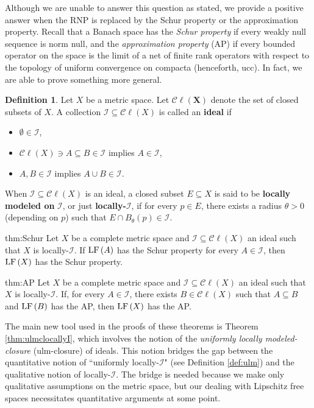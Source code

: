 \documentclass[12pt]{amsart}
\theoremstyle{definition}
\newtheorem{definition}[theorem]{Definition}
\numberwithin{equation}{section}
\def \I {\mathcal{I}}
\def \sbs {\subseteq}
\newcommand{\Cl}[1]{\mathcal{C}\ell\left(#1\right)}
\begin{document}
Although we are unable to answer this question as stated, we provide a positive answer when the RNP is replaced by the Schur property or the approximation property. Recall that a Banach space has the \emph{Schur property} if every weakly null sequence is norm null, and the \emph{approximation property} (AP) if every bounded operator on the space is the limit of a net of finite rank operators with respect to the topology of uniform convergence on compacta (henceforth, ucc). In fact, we are able to prove something more general.

\begin{definition}
Let $X$ be a metric space. Let $\boldsymbol{\Cl{X}}$ denote the set of closed subsets of $X$. A collection $\I \sbs \Cl{X}$ is called an \textbf{ideal} if
\begin{itemize}
\item $\emptyset \in \I$,
\item $\Cl{X} \ni A \sbs B \in \I$ implies $A \in \I$,
\item $A,B \in \I$ implies $A \cup B \in \I$.
\end{itemize}
When $\I \sbs \Cl{X}$ is an ideal, a closed subset $E \sbs X$ is said to be \textbf{locally modeled on} $\boldsymbol{\I}$, or just \textbf{locally-}$\boldsymbol{\I}$, if for every $p \in E$, there exists a radius $\theta > 0$ (depending on $p$) such that $E \cap B_\theta(p) \in \I$.
\end{definition}

\begin{reptheorem}{thm:Schur}
Let $X$ be a complete metric space and $\I \sbs \Cl{X}$ an ideal such that $X$ is locally-$\I$. If $\LF{A}$ has the Schur property for every $A \in \I$, then $\LF{X}$ has the Schur property.
\end{reptheorem}

\begin{reptheorem}{thm:AP}
Let $X$ be a complete metric space and $\I \sbs \Cl{X}$ an ideal such that $X$ is locally-$\I$. If, for every $A \in \I$, there exists $B \in \Cl{X}$ such that $A \sbs B$ and $\LF{B}$ has the AP, then $\LF{X}$ has the AP.
\end{reptheorem}

The main new tool used in the proofs of these theorems is Theorem \ref{thm:ulmclocallyI}, which involves the notion of the \emph{uniformly locally modeled-closure} (ulm-closure) of ideals. This notion bridges the gap between the quantitative notion of ``uniformly locally-$\I$" (see Definition \ref{def:ulm}) and the qualitative notion of locally-$\I$. The bridge is needed because we make only qualitative assumptions on the metric space, but our dealing with Lipschitz free spaces necessitates quantitative arguments at some point.
\end{document}
